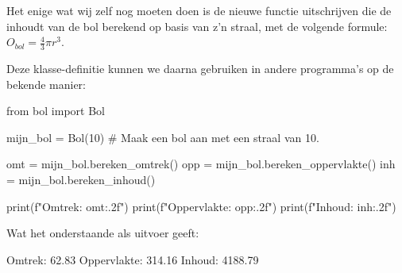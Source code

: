 Het enige wat wij zelf nog moeten doen is de nieuwe functie uitschrijven die de inhoudt van de bol berekend op basis van z'n straal, met de volgende formule: $O_{bol} = \frac{4}{3} \pi r^3$. \newline

Deze klasse-definitie kunnen we daarna gebruiken in andere programma's op de bekende manier:
\begin{python}
from bol import Bol

mijn_bol = Bol(10)  # Maak een bol aan met een straal van 10.

omt = mijn_bol.bereken_omtrek()
opp = mijn_bol.bereken_oppervlakte()
inh = mijn_bol.bereken_inhoud()

print(f"Omtrek: {omt:.2f}")
print(f"Oppervlakte: {opp:.2f}")
print(f"Inhoud: {inh:.2f}")
\end{python}

Wat het onderstaande als uitvoer geeft:
\begin{python}
Omtrek: 62.83
Oppervlakte: 314.16
Inhoud: 4188.79
\end{python}



%




